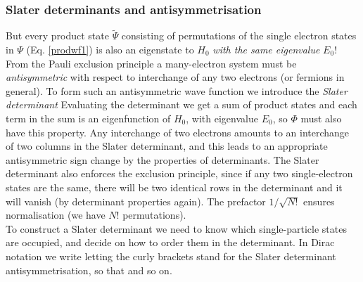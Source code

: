 \subsubsection{Slater determinants and antisymmetrisation}
But every product state $\tilde{\Psi}$ consisting of permutations of the single electron states in $\Psi$ (Eq. \eqref{prodwf1}) is also an eigenstate to $H_0$ \emph{with the same eigenvalue} $E_0$! From the Pauli exclusion principle a many-electron system must be \emph{antisymmetric} with respect to interchange of any two electrons (or fermions in general). To form such an antisymmetric wave function we introduce the \emph{Slater determinant}
Evaluating the determinant we get a sum of product states and each term in the sum is an eigenfunction of $H_0$, with eigenvalue $E_0$, so $\Phi$ must also have this property. Any interchange of two electrons amounts to an interchange of two columns in the Slater determinant, and this leads to an appropriate antisymmetric sign change by the properties of determinants. The Slater determinant also enforces the exclusion principle, since if any two single-electron states are the same, there will be two identical rows in the determinant and it will vanish (by determinant properties again). The prefactor $1/\sqrt{N!}$ ensures normalisation (we have $N!$ permutations).\\
\indent To construct a Slater determinant we need to know which single-particle states are occupied, and decide on how to order them in the determinant. In Dirac notation we write
letting the curly brackets stand for the Slater determinant antisymmetrisation, so that
and so on.
